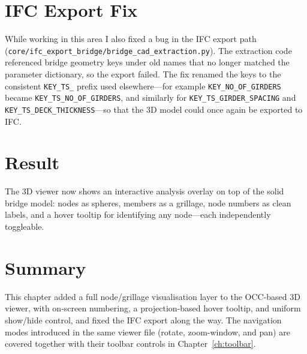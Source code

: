 \section{IFC Export Fix}
\label{sec:ifcfix}
While working in this area I also fixed a bug in the IFC export path
(\texttt{core/ifc\_export\_bridge/bridge\_cad\_extraction.py}). The extraction code referenced
bridge geometry keys under old names that no longer matched the parameter dictionary, so the
export failed. The fix renamed the keys to the consistent \texttt{KEY\_TS\_} prefix used
elsewhere---for example \texttt{KEY\_NO\_OF\_GIRDERS} became \texttt{KEY\_TS\_NO\_OF\_GIRDERS},
and similarly for \texttt{KEY\_TS\_GIRDER\_SPACING} and \texttt{KEY\_TS\_DECK\_THICKNESS}---so
that the 3D model could once again be exported to IFC.

\section{Result}
The 3D viewer now shows an interactive analysis overlay on top of the solid bridge model:
nodes as spheres, members as a grillage, node numbers as clean labels, and a hover tooltip for
identifying any node---each independently toggleable.



\section{Summary}
This chapter added a full node/grillage visualisation layer to the OCC-based 3D viewer, with
on-screen numbering, a projection-based hover tooltip, and uniform show/hide control, and fixed
the IFC export along the way. The navigation modes introduced in the same viewer file
(rotate, zoom-window, and pan) are covered together with their toolbar controls in
Chapter~\ref{ch:toolbar}.
